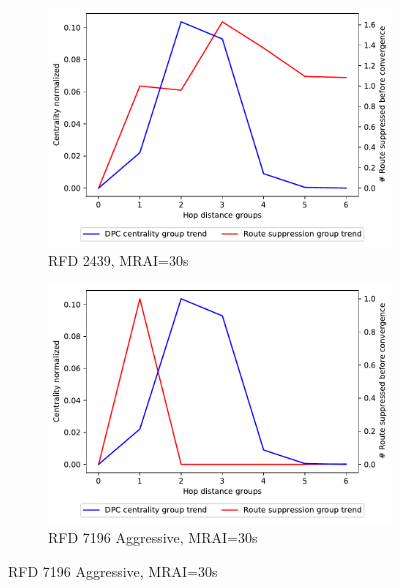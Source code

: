 \begin{figure}[H]
\begin{subfigure}[b]{0.325\textwidth}
     \end{subfigure}
     \vfill
     \begin{subfigure}[b]{0.325\textwidth}
         \centering
         \includegraphics[width=\textwidth]{images/RFD/miceVSelephants/MultiMRAI/30/elephants/cisco_1000_RFD_nodeConvergence_centVSsup_trend.pdf}
         \caption{\scriptsize RFD 2439, MRAI=30s}
         \label{fig:1000_2439RFD_centVSsup_elephants_MRAI30}
     \end{subfigure}
     \hfill
     \begin{subfigure}[b]{0.325\textwidth}
         \centering
         \includegraphics[width=\textwidth]{images/RFD/miceVSelephants/MultiMRAI/30/elephants/cisco_1000_RFD_7196_aggressive_nodeConvergence_centVSsup_trend.pdf}
         \caption{\scriptsize RFD 7196 Aggressive, MRAI=30s}
         \label{fig:1000_7196RFDA_centVSsup_elephants_MRAI30}

\end{subfigure}
\end{figure}
